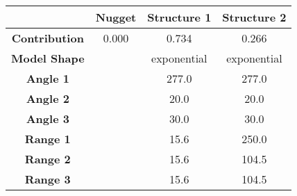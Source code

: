 \begin{tabular}{cccc}
\toprule
{} & Nugget &  Structure 1 &  Structure 2 \\
\midrule
\textbf{Contribution} &  0.000 &        0.734 &        0.266 \\
\textbf{Model Shape } &        &  exponential &  exponential \\
\textbf{Angle 1     } &        &        277.0 &        277.0 \\
\textbf{Angle 2     } &        &         20.0 &         20.0 \\
\textbf{Angle 3     } &        &         30.0 &         30.0 \\
\textbf{Range 1     } &        &         15.6 &        250.0 \\
\textbf{Range 2     } &        &         15.6 &        104.5 \\
\textbf{Range 3     } &        &         15.6 &        104.5 \\
\bottomrule
\end{tabular}
